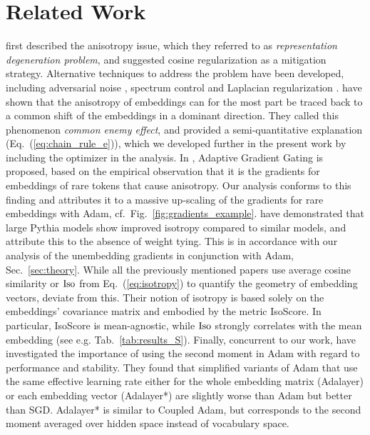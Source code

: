 \section{Related Work}
\label{sec:related_work}

\citet{gao2019representationdegenerationproblemtraining}
first described the anisotropy issue, which they referred to as \textit{representation degeneration problem}, and suggested cosine regularization as a mitigation strategy.
Alternative techniques to address the problem have been developed, including adversarial noise \cite{pmlr-v97-wang19f}, spectrum control \cite{Wang2020ImprovingNL} and Laplacian regularization \cite{zhang-etal-2020-revisiting}.  
\citet{bis2021tmic} have shown that the anisotropy of embeddings can for the most part be traced back to a common shift of the embeddings in a dominant direction. They called this phenomenon \textit{common enemy effect}, and provided a semi-quantitative explanation (Eq.~(\ref{eq:chain_rule_e})), which we developed further in the present work by including the optimizer in the analysis.
In \citet{yu-etal-2022-rare}, Adaptive Gradient Gating is proposed, based on the empirical observation that it is the gradients for embeddings of rare tokens that cause anisotropy. Our analysis conforms to this finding and attributes it to a massive up-scaling of the gradients for rare embeddings with Adam, cf.~Fig.~\ref{fig:gradients_example}.
\citet{machina-mercer-2024-anisotropy} have demonstrated that large Pythia models \cite{pmlr-v202-biderman23a} show improved isotropy compared to similar models, and attribute this to the absence of weight tying. This is in accordance with our analysis of the unembedding gradients in conjunction with Adam, Sec.~\ref{sec:theory}.
While all the previously mentioned papers use average cosine similarity \cite{ethayarajh-2019-contextual} or ${\rm Iso}$ from Eq.~(\ref{eq:isotropy}) to quantify the geometry of embedding vectors, \citet{rudman-etal-2022-isoscore} deviate from this. 
Their notion of isotropy is based solely on the embeddings' covariance matrix and embodied by the metric IsoScore. 
In particular, IsoScore is mean-agnostic, while ${\rm Iso}$ strongly correlates with the mean embedding (see e.g. Tab.~\ref{tab:results_S}).
Finally, concurrent to our work, \citet{zhao2024deconstructingmakesgoodoptimizer} have investigated the importance of using the second moment in Adam with regard to performance and stability. They found that simplified variants of Adam that use the same effective learning rate either for the whole embedding matrix (Adalayer) or each embedding vector (Adalayer*) are slightly worse than Adam but better than SGD. Adalayer* is similar to Coupled Adam, but corresponds to the second moment averaged over hidden space instead of vocabulary space.
